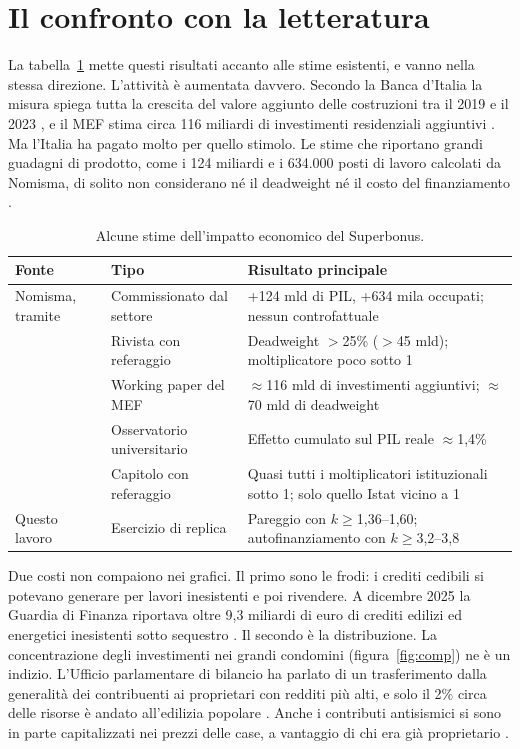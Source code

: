 \documentclass[11pt,a4paper]{article}
\begin{document}
\section{Il confronto con la letteratura}
La tabella~\ref{tab:lit} mette questi risultati accanto alle stime esistenti, e vanno nella stessa direzione. L'attività è aumentata davvero. Secondo la Banca d'Italia la misura spiega tutta la crescita del valore aggiunto delle costruzioni tra il 2019 e il 2023 \citep{accetturo2026}, e il MEF stima circa 116 miliardi di investimenti residenziali aggiuntivi \citep{mef_wp}. Ma l'Italia ha pagato molto per quello stimolo. Le stime che riportano grandi guadagni di prodotto, come i 124 miliardi e i 634.000 posti di lavoro calcolati da Nomisma, di solito non considerano né il deadweight né il costo del finanziamento \citep{codogno2024}.

\begin{table}[H]\centering\small
\caption{Alcune stime dell'impatto economico del Superbonus.}\label{tab:lit}
\begin{tabular}{p{4.1cm}p{3.4cm}p{6.3cm}}
\toprule
Fonte & Tipo & Risultato principale \\
\midrule
Nomisma, tramite \citet{codogno2024} & Commissionato dal settore & +124 mld di PIL, +634 mila occupati; nessun controfattuale \\
\citet{accetturo2026} & Rivista con referaggio & Deadweight $>$25\% ($>$45 mld); moltiplicatore poco sotto 1 \\
\citet{mef_wp} & Working paper del MEF & $\approx$116 mld di investimenti aggiuntivi; $\approx$70 mld di deadweight \\
\citet{ocpi2023} & Osservatorio universitario & Effetto cumulato sul PIL reale $\approx$1,4\% \\
\citet{capone2026} & Capitolo con referaggio & Quasi tutti i moltiplicatori istituzionali sotto 1; solo quello Istat vicino a 1 \\
Questo lavoro & Esercizio di replica & Pareggio con $k\ge$1,36--1,60; autofinanziamento con $k\ge$3,2--3,8 \\
\bottomrule
\end{tabular}
\end{table}

Due costi non compaiono nei grafici. Il primo sono le frodi: i crediti cedibili si potevano generare per lavori inesistenti e poi rivendere. A dicembre 2025 la Guardia di Finanza riportava oltre 9,3 miliardi di euro di crediti edilizi ed energetici inesistenti sotto sequestro \citep{sky2025}. Il secondo è la distribuzione. La concentrazione degli investimenti nei grandi condomini (figura~\ref{fig:comp}) ne è un indizio. L'Ufficio parlamentare di bilancio ha parlato di un trasferimento dalla generalità dei contribuenti ai proprietari con redditi più alti, e solo il 2\% circa delle risorse è andato all'edilizia popolare \citep{capone2026}. Anche i contributi antisismici si sono in parte capitalizzati nei prezzi delle case, a vantaggio di chi era già proprietario \citep{crispino2025}.
\end{document}
